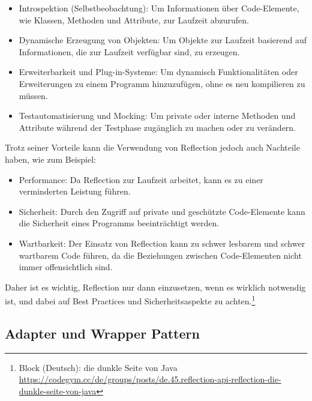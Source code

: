 \documentclass[../vs-script-first-v01.tex]{subfiles}
\begin{document}
\begin{itemize}
\item Introspektion (Selbstbeobachtung): Um Informationen über Code-Elemente, wie Klassen, Methoden und Attribute, zur Laufzeit abzurufen.
\item Dynamische Erzeugung von Objekten: Um Objekte zur Laufzeit basierend auf Informationen, die zur Laufzeit verfügbar sind, zu erzeugen.
\item Erweiterbarkeit und Plug-in-Systeme: Um dynamisch Funktionalitäten oder Erweiterungen zu einem Programm hinzuzufügen, ohne es neu kompilieren zu müssen.
\item Testautomatisierung und Mocking: Um private oder interne Methoden und Attribute während der Testphase zugänglich zu machen oder zu verändern.
\end{itemize}    
Trotz seiner Vorteile kann die Verwendung von Reflection jedoch auch Nachteile haben, wie zum Beispiel:
\begin{itemize}
\item Performance: Da Reflection zur Laufzeit arbeitet, kann es zu einer verminderten Leistung führen.
\item Sicherheit: Durch den Zugriff auf private und geschützte Code-Elemente kann die Sicherheit eines Programms beeinträchtigt werden.
\item Wartbarkeit: Der Einsatz von Reflection kann zu schwer lesbarem und schwer wartbarem Code führen, da die Beziehungen zwischen Code-Elementen nicht immer offensichtlich sind.
\end{itemize}   
Daher ist es wichtig, Reflection nur dann einzusetzen, wenn es wirklich notwendig ist, und dabei auf Best Practices und Sicherheitsaspekte zu achten.\footnote{Block (Deutsch): die dunkle Seite von Java \url{https://codegym.cc/de/groups/posts/de.45.reflection-api-reflection-die-dunkle-seite-von-java}}

\subsection{Adapter und Wrapper Pattern}
\end{document}
